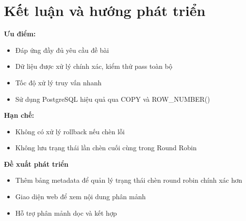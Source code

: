 \documentclass[14pt]{extarticle}
\begin{document}
\clearpage
\section{Kết luận và hướng phát triển}
\textbf{Ưu điểm:}
\begin{itemize}
    \item Đáp ứng đầy đủ yêu cầu đề bài
    \item Dữ liệu được xử lý chính xác, kiểm thử pass toàn bộ
    \item Tốc độ xử lý truy vấn nhanh
    \item Sử dụng PostgreSQL hiệu quả qua COPY và ROW\_NUMBER()
\end{itemize}
\textbf{Hạn chế:}
\begin{itemize}
    \item Không có xử lý rollback nếu chèn lỗi
    \item Không lưu trạng thái lần chèn cuối cùng trong Round Robin

\end{itemize}
\textbf{Đề xuất phát triển}
\begin{itemize}
    \item Thêm bảng metadata để quản lý trạng thái chèn round robin chính xác hơn
    \item Giao diện web để xem nội dung phân mảnh
    \item Hỗ trợ phân mảnh dọc và kết hợp
\end{itemize}
\clearpage
\end{document}
